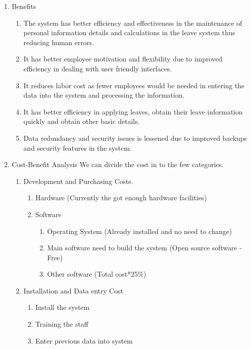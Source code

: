 \begin{enumerate}
\item{Benefits}

  \begin{enumerate}
    \item{The system has better efficiency and effectiveness in the maintenance of personal information details and calculations in the leave system thus reducing human errors.}
    \item{It has better employee motivation and flexibility due to improved efficiency in
      dealing with user friendly interfaces.}
    \item{It reduces labor cost as fewer employees would be needed in entering the data
      into the system and processing the information.}
    \item{It has better efficiency in applying leaves, obtain their leave information quickly and obtain other basic details.}
    \item{Data redundancy and security issues is lessened due to improved backups and security features in the system.}
  \end{enumerate}

\item{Cost-Benefit Analysis}
  We can divide the cost in to the few categories.
  \begin{enumerate}
  \item{Development and Purchasing Costs.}
    \begin{enumerate}
    \item{Hardware (Currently the got enough hardware facilities)}
    \item{Software}

      \begin{enumerate}
      \item{Operating System (Already installed and no need to change)}
      \item{Main software need to build the system (Open source software - Free)}
      \item{Other software (Total cost*25\%)}
      \end{enumerate}
        
    \end{enumerate}
  \item{Installation and Data entry Cost}

    \begin{enumerate}
    \item{Install the system}
    \item{Training the staff}
    \item{Enter previous data into system}
    \end{enumerate}
    

\end{enumerate}
\end{enumerate}
